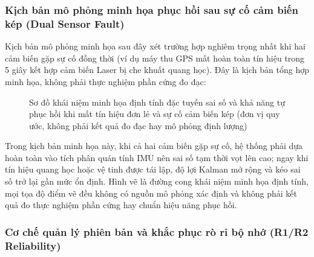 \subsubsection{Kịch bản mô phỏng minh họa phục hồi sau sự cố cảm biến kép (Dual Sensor Fault)}

\hspace{0.5cm} Kịch bản mô phỏng minh họa sau đây xét trường hợp nghiêm trọng nhất khi hai cảm biến gặp sự cố đồng thời (ví dụ máy thu GPS mất hoàn toàn tín hiệu trong 5 giây kết hợp cảm biến Laser bị che khuất quang học). Đây là kịch bản tổng hợp minh họa, không phải thực nghiệm phần cứng đo đạc:

\begin{figure}[H]
\centering
{}
\caption{Sơ đồ khái niệm minh họa định tính đặc tuyến sai số và khả năng tự phục hồi khi mất tín hiệu đơn lẻ và sự cố cảm biến kép (đơn vị quy ước, không phải kết quả đo đạc hay mô phỏng định lượng)}
\label{fig:sensor-recovery}
\end{figure}

Trong kịch bản minh họa này, khi cả hai cảm biến gặp sự cố, hệ thống phải dựa hoàn toàn vào tích phân quán tính IMU nên sai số tạm thời vọt lên cao; ngay khi tín hiệu quang học hoặc vệ tinh được tái lập, độ lợi Kalman mở rộng và kéo sai số trở lại gần mức ổn định. Hình vẽ là đường cong khái niệm minh họa định tính, mọi tọa độ điểm vẽ đều không có nguồn mô phỏng xác định và không phải kết quả đo thực nghiệm phần cứng hay chuẩn hiệu năng phục hồi.

\subsubsection{Cơ chế quản lý phiên bản và khắc phục rò rỉ bộ nhớ (R1/R2 Reliability)}

